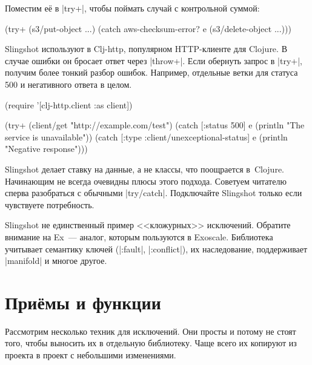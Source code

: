 \noindent
Поместим е\"{е} в \spverb|try+|, чтобы поймать случай с контрольной суммой:

\begin{english}
  \begin{clojure}
(try+
  (s3/put-object ...)
  (catch aws-checksum-error? e
    (s3/delete-object ...)))
  \end{clojure}
\end{english}

Slingshot используют в Clj-http,
популярном HTTP-клиенте для Clojure. В случае ошибки он бросает ответ через
\spverb|throw+|. Если обернуть запрос в \spverb|try+|, получим более тонкий
разбор ошибок. Например, отдельные ветки для статуса 500 и негативного ответа в
целом.

\begin{english}
  \begin{clojure}
(require '[clj-http.client :as client])

(try+
 (client/get "http://example.com/test")
 (catch [:status 500] e
   (println "The service is unavailable"))
 (catch [:type :client/unexceptional-status] e
   (println "Negative response")))
  \end{clojure}
\end{english}

Slingshot делает ставку на данные, а не классы, что поощрается
в~Clojure. Начинающим не всегда очевидны плюсы этого подхода. Советуем читателю
сперва разобраться с обычными \spverb|try/catch|. Подключайте Slingshot только
если чувствуете потребность.


Slingshot не единственный пример <<кложурных>> исключений. Обратите внимание на
Ex~--- аналог, которым пользуются в
Exoscale. Библиотека учитывает семантику ключей (\spverb|:fault|,
\spverb|:conflict|), их наследование, поддерживает \spverb|manifold| и многое
другое.

\section{При\"{е}мы и функции}

Рассмотрим несколько техник для исключений. Они просты и потому не стоят того,
чтобы выносить их в отдельную библиотеку. Чаще всего их копируют из проекта в
проект с небольшими изменениями.


